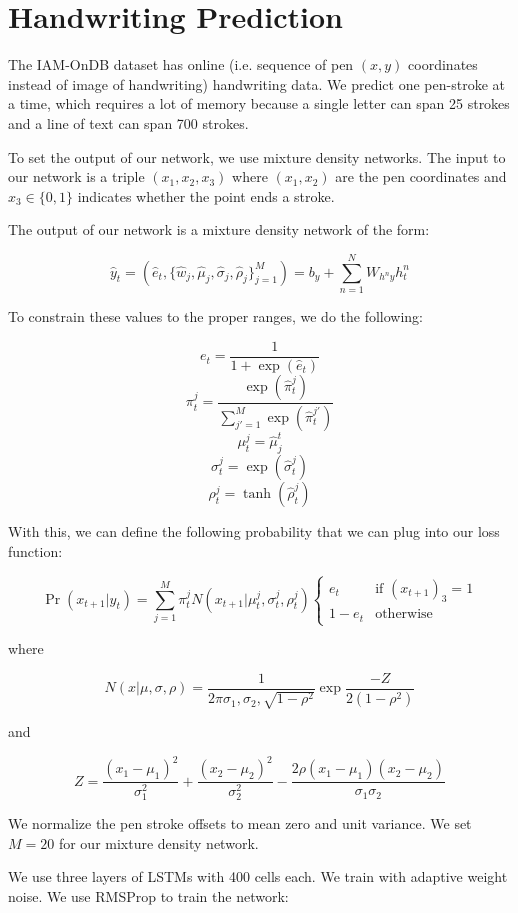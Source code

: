 \documentclass[a4paper]{article}
\begin{document}
\section{Handwriting Prediction}
The IAM-OnDB dataset has online (i.e. sequence of pen $(x, y)$ coordinates
instead of image of handwriting) handwriting data. We predict one pen-stroke
at a time, which requires a lot of memory because a single letter can span
25 strokes and a line of text can span 700 strokes.

To set the output of our network, we use mixture density networks. The input
to our network is a triple $(x_1, x_2, x_3)$ where $(x_1, x_2)$ are the pen
coordinates and $x_3 \in \{0, 1\}$ indicates whether the point ends a stroke.

The output of our network is a mixture density network of the form:

$$
\hat{y}_t = (\hat{e}_t, \{
\hat{w}_j, \hat{\mu}_j, \hat{\sigma}_j, \hat{\rho}_j
\}_{j=1}^{M}) = b_y + \sum_{n=1}^{N}{W_{h^n y}{h_t^n}}
$$

To constrain these values to the proper ranges, we do the following:

$$
e_t = \frac{1}{1 + \exp(\hat{e}_t)}
$$
$$
\pi_t^j = \frac{\exp(\hat{\pi}_t^j)}{\sum_{j'=1}^{M}{\exp(\hat{\pi}_t^{j'})}}
$$
$$
\mu_t^j = \hat{\mu}^t_j
$$
$$
\sigma_t^j = \exp(\hat{\sigma}_t^j)
$$
$$
\rho_t^j = \tanh(\hat{\rho}_t^j)
$$

With this, we can define the following probability that we can plug into our
loss function:

$$
\Pr(x_{t+1} | y_t) = \sum_{j=1}^{M}{
\pi_t^j N(x_{t+1} | \mu_t^j, \sigma_t^j, \rho_t^j)
\begin{cases}
  e_t & \text{if $(x_{t+1})_3 = 1$} \\
  1 - e_t & \text{otherwise}
\end{cases}
}
$$

where

$$
N(x | \mu, \sigma, \rho) = \frac{1}{2 \pi \sigma_1, \sigma_2, \sqrt{
1 - \rho^2
}} \exp{\frac{-Z}{2(1 - \rho^2)}}
$$

and

$$
Z = \frac{(x_1 - \mu_1)^2}{\sigma_1^2} + \frac{(x_2 - \mu_2)^2}{\sigma_2^2} -
\frac{2 \rho (x_1 - \mu_1)(x_2 - \mu_2)}{\sigma_1 \sigma_2}
$$

We normalize the pen stroke offsets to mean zero and unit variance. We set
$M = 20$ for our mixture density network.

We use three layers of LSTMs with 400 cells each. We train with adaptive
weight noise. We use RMSProp to train the network:
\end{document}
